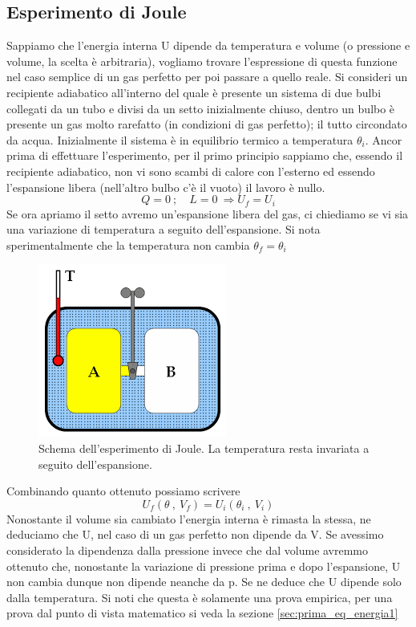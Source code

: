 \documentclass[
10pt, %
a4paper, %
oneside, %
headinclude,footinclude, %
BCOR5mm, %
]{scrartcl}
\begin{document}
\subsection{Esperimento di Joule}
Sappiamo che l'energia interna U dipende da temperatura e volume (o pressione e volume, la scelta è arbitraria), vogliamo trovare l'espressione di questa funzione nel caso semplice di un gas perfetto per poi passare a quello reale. Si consideri un recipiente adiabatico all'interno del quale è presente un sistema di due bulbi collegati da un tubo e divisi da un setto inizialmente chiuso, dentro un bulbo è presente un gas molto rarefatto (in condizioni di gas perfetto); il tutto circondato da acqua. Inizialmente il sistema è in equilibrio termico a temperatura $\theta_i$.
Ancor prima di effettuare l'esperimento, per il primo principio sappiamo che, essendo il recipiente adiabatico, non vi sono scambi di calore con l'esterno ed essendo l'espansione libera (nell'altro bulbo c'è il vuoto) il lavoro è nullo. 
\[Q = 0\ ; \quad L = 0\ \Rightarrow U_f = U_i\]
Se ora apriamo il setto avremo un'espansione libera del gas, ci chiediamo se vi sia una variazione di temperatura a seguito dell'espansione. Si nota sperimentalmente che la temperatura non cambia \(\theta_f = \theta_i\)
\begin{figure}[h!]
	\centering
	\includegraphics[width=0.4\linewidth]{../images/esperimento_Joule}
	\caption{Schema dell'esperimento di Joule. La temperatura resta invariata a seguito dell'espansione.}
	\label{fig:esperimentojoule}
\end{figure}
\FloatBarrier
Combinando quanto ottenuto possiamo scrivere
\[U_f(\theta\ ,\ V_f) = U_i(\theta_i\ ,\ V_i)\]
Nonostante il volume sia cambiato l'energia interna è rimasta la stessa, ne deduciamo che U, nel caso di un gas perfetto non dipende da V. Se avessimo considerato la dipendenza dalla pressione invece che dal volume avremmo ottenuto che, nonostante la variazione di pressione prima e dopo l'espansione, U non cambia dunque non dipende neanche da p. Se ne deduce che U dipende solo dalla temperatura. Si noti che questa è solamente una prova empirica, per una prova dal punto di vista matematico si veda la sezione \ref{sec:prima_eq_energia1}\\
\end{document}
